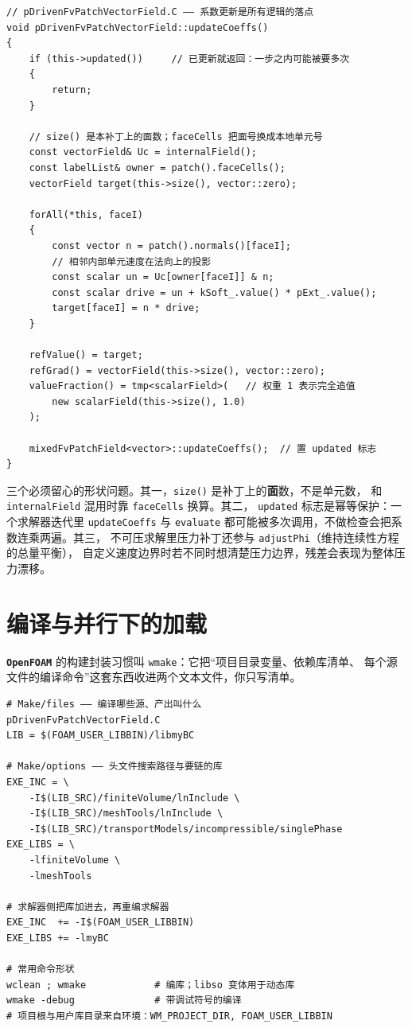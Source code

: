 \documentclass[12pt,a4paper,fontset=fandol]{ctexbook}
\newcommand{\Tp}[1]{\texttt{#1}}
\newcommand{\Lib}[1]{\textbf{\texttt{#1}}}
\begin{document}
\begin{lstlisting}[style=cppstyle, caption={\Tp{updateCoeffs} 的实现形状：
把面速度按外部压力与标定系数拉回目标值}, label={lst:ch06-bc-impl}]
// pDrivenFvPatchVectorField.C —— 系数更新是所有逻辑的落点
void pDrivenFvPatchVectorField::updateCoeffs()
{
    if (this->updated())     // 已更新就返回：一步之内可能被要多次
    {
        return;
    }

    // size() 是本补丁上的面数；faceCells 把面号换成本地单元号
    const vectorField& Uc = internalField();
    const labelList& owner = patch().faceCells();
    vectorField target(this->size(), vector::zero);

    forAll(*this, faceI)
    {
        const vector n = patch().normals()[faceI];
        // 相邻内部单元速度在法向上的投影
        const scalar un = Uc[owner[faceI]] & n;
        const scalar drive = un + kSoft_.value() * pExt_.value();
        target[faceI] = n * drive;
    }

    refValue() = target;
    refGrad() = vectorField(this->size(), vector::zero);
    valueFraction() = tmp<scalarField>(   // 权重 1 表示完全追值
        new scalarField(this->size(), 1.0)
    );

    mixedFvPatchField<vector>::updateCoeffs();  // 置 updated 标志
}
\end{lstlisting}

三个必须留心的形状问题。其一，\Tp{size()} 是补丁上的\textbf{面}数，不是单元数，
和 \Tp{internalField} 混用时靠 \Tp{faceCells} 换算。其二，
\Tp{updated} 标志是幂等保护：一个求解器迭代里 \Tp{updateCoeffs} 与
\Tp{evaluate} 都可能被多次调用，不做检查会把系数连乘两遍。其三，
不可压求解里压力补丁还参与 \Tp{adjustPhi}（维持连续性方程的总量平衡），
自定义速度边界时若不同时想清楚压力边界，残差会表现为整体压力漂移。

\section{编译与并行下的加载}
\label{sec:ch06-build}

\Lib{OpenFOAM} 的构建封装习惯叫 \Tp{wmake}：它把``项目目录变量、依赖库清单、
每个源文件的编译命令''这套东西收进两个文本文件，你只写清单。

\begin{lstlisting}[style=cmakestyle, caption={构建清单形状：\Tp{Make/files} 与
\Tp{Make/options} 两个文本文件}, label={lst:ch06-build}]
# Make/files —— 编译哪些源、产出叫什么
pDrivenFvPatchVectorField.C
LIB = $(FOAM_USER_LIBBIN)/libmyBC

# Make/options —— 头文件搜索路径与要链的库
EXE_INC = \
    -I$(LIB_SRC)/finiteVolume/lnInclude \
    -I$(LIB_SRC)/meshTools/lnInclude \
    -I$(LIB_SRC)/transportModels/incompressible/singlePhase
EXE_LIBS = \
    -lfiniteVolume \
    -lmeshTools

# 求解器侧把库加进去，再重编求解器
EXE_INC  += -I$(FOAM_USER_LIBBIN)
EXE_LIBS += -lmyBC

# 常用命令形状
wclean ; wmake            # 编库；libso 变体用于动态库
wmake -debug              # 带调试符号的编译
# 项目根与用户库目录来自环境：WM_PROJECT_DIR, FOAM_USER_LIBBIN
\end{lstlisting}
\end{document}
